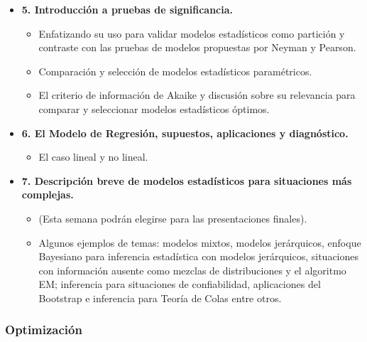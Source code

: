 \documentclass[10pt,a4paper]{article}
\begin{document}
\begin{itemize}
    \item \textbf{5. Introducción a pruebas de significancia.}
    \begin{itemize}
        \item Enfatizando su uso para validar modelos estadísticos como partición y contraste con las pruebas de modelos propuestas por Neyman y Pearson.
        \item Comparación y selección de modelos estadísticos paramétricos.
        \item El criterio de información de Akaike y discusión sobre su relevancia para comparar y seleccionar modelos estadísticos óptimos.
    \end{itemize}

    \item \textbf{6. El Modelo de Regresión, supuestos, aplicaciones y diagnóstico.}
    \begin{itemize}
        \item El caso lineal y no lineal.
    \end{itemize}

    \item \textbf{7. Descripción breve de modelos estadísticos para situaciones más complejas.}
    \begin{itemize}
        \item (Esta semana podrán elegirse para las presentaciones finales).
        \item Algunos ejemplos de temas: modelos mixtos, modelos jerárquicos, enfoque Bayesiano para inferencia estadística con modelos jerárquicos, situaciones con información ausente como mezclas de distribuciones y el algoritmo EM; inferencia para situaciones de confiabilidad, aplicaciones del Bootstrap e inferencia para Teoría de Colas entre otros.
    \end{itemize}
\end{itemize}
\subsubsection{Optimización}
\end{document}
